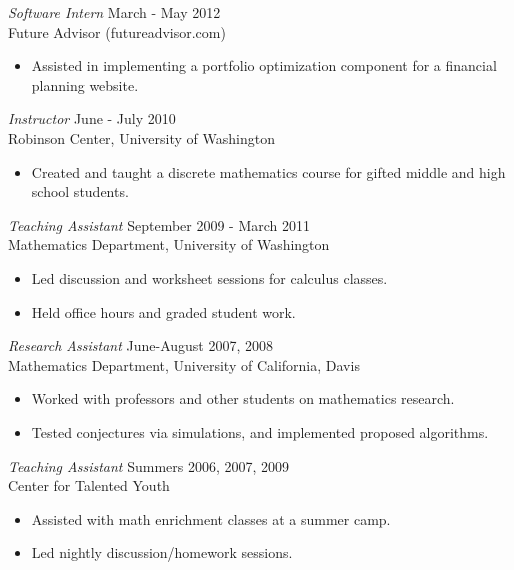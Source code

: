 \documentclass{res}
\begin{document}
\begin{resume}
                {\sl Software Intern} \hfill            March - May 2012\\
                Future Advisor (futureadvisor.com)
                 \begin{itemize}  \itemsep -2pt %
                 \item Assisted in implementing a portfolio optimization component for a financial planning website.
                 \end{itemize} 
                {\sl Instructor} \hfill            June - July 2010\\
                Robinson Center, University of Washington
                 \begin{itemize}  \itemsep -2pt %
                 \item Created and taught a discrete mathematics course for gifted middle and high school students.
                 \end{itemize} 
                {\sl Teaching Assistant} \hfill            September 2009 - March 2011\\
                Mathematics Department, University of Washington
                 \begin{itemize}  \itemsep -2pt %
                 \item Led discussion and worksheet sessions for calculus classes.
		\item Held office hours and graded student work.
		\end{itemize}
                {\sl Research Assistant} \hfill            June-August 2007, 2008\\
                Mathematics Department, University of California, Davis
                 \begin{itemize}  \itemsep -2pt %
                 \item Worked with professors and other students on mathematics research.
		\item Tested conjectures via simulations, and implemented proposed algorithms.
                 \end{itemize} 
                {\sl Teaching Assistant} \hfill            Summers 2006, 2007, 2009\\
                Center for Talented Youth
                 \begin{itemize}  \itemsep -2pt %
                 \item Assisted with math enrichment classes at a summer camp.
		\item Led nightly discussion/homework sessions.
                 \end{itemize} 

\end{resume}
\end{document}

